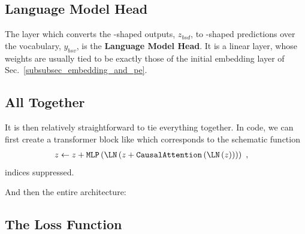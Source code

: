 \documentclass[11pt]{article}
\begin{document}
\subsection{Language Model Head \label{subsubsec_language_model_head} }


The layer which converts the -shaped outputs, $ z _{ bsd } $, to -shaped
predictions over the vocabulary, $  y _{ bsv } $, is the \textbf{Language Model Head}. It
is a linear layer, whose weights are usually tied to be exactly those of the initial embedding
layer of Sec.~\ref{subsubsec_embedding_and_pe}.


\subsection{All Together}
It is then relatively straightforward to tie everything together.  In code, we can first create a
transformer block like
which corresponds to the schematic function
\begin{align}
  z &\leftarrow  z + \texttt{MLP}\left ( \LN \left ( z + \texttt{CausalAttention}\left ( \LN \left (
  z\right ) \right )  \right ) \right )\ ,
\end{align}
indices suppressed.

And then the entire architecture: 


\subsection{The Loss Function}
\end{document}
